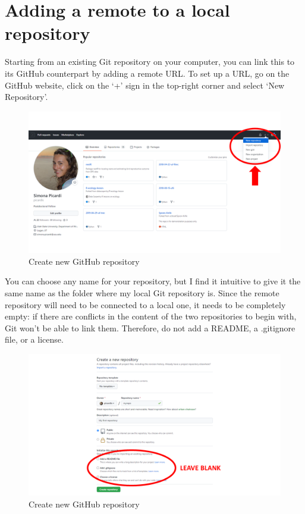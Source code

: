 \documentclass[
]{book}
\begin{document}
\hypertarget{adding-a-remote-to-a-local-repository}{%
\section{Adding a remote to a local repository}\label{adding-a-remote-to-a-local-repository}}

Starting from an existing Git repository on your computer, you can link this to its GitHub counterpart by adding a remote URL. To set up a URL, go on the GitHub website, click on the `+' sign in the top-right corner and select `New Repository'.

\begin{figure}

{\centering \includegraphics[width=1\linewidth]{img/github-01} 

}

\caption{Create new GitHub repository}\label{fig:github01}
\end{figure}

You can choose any name for your repository, but I find it intuitive to give it the same name as the folder where my local Git repository is. Since the remote repository will need to be connected to a local one, it needs to be completely empty: if there are conflicts in the content of the two repositories to begin with, Git won't be able to link them. Therefore, do not add a README, a .gitignore file, or a license.

\begin{figure}

{\centering \includegraphics[width=1\linewidth]{img/github-02} 

}

\caption{Create new GitHub repository}\label{fig:github02}
\end{figure}
\end{document}
